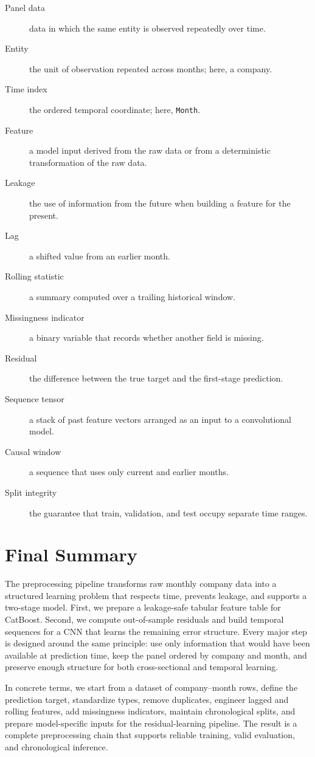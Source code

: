 \documentclass[11pt]{article}
\begin{document}
\begin{description}
    \item[Panel data] data in which the same entity is observed repeatedly over time.
    \item[Entity] the unit of observation repeated across months; here, a company.
    \item[Time index] the ordered temporal coordinate; here, \texttt{Month}.
    \item[Feature] a model input derived from the raw data or from a deterministic transformation of the raw data.
    \item[Leakage] the use of information from the future when building a feature for the present.
    \item[Lag] a shifted value from an earlier month.
    \item[Rolling statistic] a summary computed over a trailing historical window.
    \item[Missingness indicator] a binary variable that records whether another field is missing.
    \item[Residual] the difference between the true target and the first-stage prediction.
    \item[Sequence tensor] a stack of past feature vectors arranged as an input to a convolutional model.
    \item[Causal window] a sequence that uses only current and earlier months.
    \item[Split integrity] the guarantee that train, validation, and test occupy separate time ranges.
\end{description}

\section{Final Summary}

The preprocessing pipeline transforms raw monthly company data into a structured learning problem that respects time, prevents leakage, and supports a two-stage model. First, we prepare a leakage-safe tabular feature table for CatBoost. Second, we compute out-of-sample residuals and build temporal sequences for a CNN that learns the remaining error structure. Every major step is designed around the same principle: use only information that would have been available at prediction time, keep the panel ordered by company and month, and preserve enough structure for both cross-sectional and temporal learning.

In concrete terms, we start from a dataset of company--month rows, define the prediction target, standardize types, remove duplicates, engineer lagged and rolling features, add missingness indicators, maintain chronological splits, and prepare model-specific inputs for the residual-learning pipeline. The result is a complete preprocessing chain that supports reliable training, valid evaluation, and chronological inference.
\end{document}
